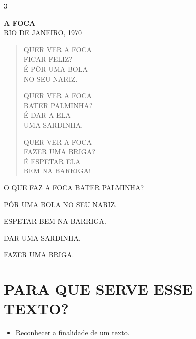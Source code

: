 {\num{3}

\textbf{A FOCA}\\
RIO DE JANEIRO, 1970

\begin{verse}
QUER VER A FOCA\\
FICAR FELIZ?\\
É PÔR UMA BOLA\\
NO SEU NARIZ.

QUER VER A FOCA\\
BATER PALMINHA?\\
É DAR A ELA\\
UMA SARDINHA.

QUER VER A FOCA\\
FAZER UMA BRIGA?\\
É ESPETAR ELA\\
BEM NA BARRIGA!
\end{verse}

}

O QUE FAZ A FOCA BATER PALMINHA?

\begin{escolha}
\item PÔR UMA BOLA NO SEU NARIZ.

\item ESPETAR BEM NA BARRIGA.

\item DAR UMA SARDINHA.

\item FAZER UMA BRIGA.
\end{escolha}


\chapter{PARA QUE SERVE ESSE TEXTO?}


\begin{itemize}
\item Reconhecer a finalidade de um texto.
\end{itemize}


